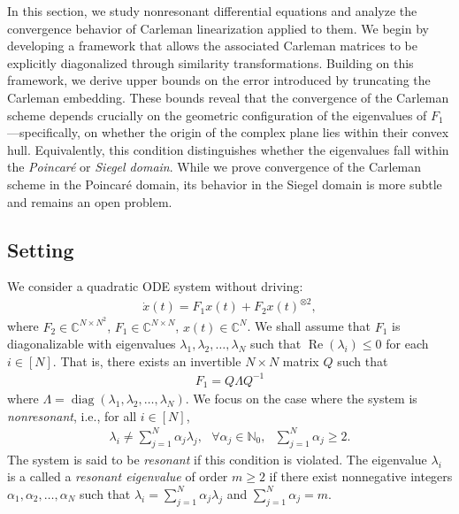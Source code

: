 \documentclass[superscriptaddress,onecolumn,nofootinbib,longbibliography,a4paper,accepted=2026-09-29]{quantumarticle}
\theoremstyle{plain}
\theoremstyle{definition}
\numberwithin{thm}{section}
\numberwithin{assumption}{section}
\numberwithin{lemma}{section}
\numberwithin{prop}{section}
\numberwithin{cor}{section}
\numberwithin{definition}{section}
\numberwithin{rmk}{section}
\numberwithin{equation}{section}
\newcommand{\myC}{\mathbb{C}}
\newcommand{\myN}{\mathbb{N}}
\newcommand{\lrb}[1]{\left ( #1 \right )}
\newcommand{\realpart}[1]{\operatorname{Re}\lrb{#1}}
\newcommand{\diag}[1]{\operatorname{diag}\lrb{#1}}
\begin{document}
In this section, we study nonresonant differential equations and analyze the convergence behavior of Carleman linearization applied to them. We begin by developing a framework that allows the associated Carleman matrices to be explicitly diagonalized through similarity transformations. Building on this framework, we derive upper bounds on the error introduced by truncating the Carleman embedding. These bounds reveal that the convergence of the Carleman scheme depends crucially on the geometric configuration of the eigenvalues of $F_1$—specifically, on whether the origin of the complex plane lies within their convex hull. Equivalently, this condition distinguishes whether the eigenvalues fall within the \emph{Poincar\'{e}} or \emph{Siegel domain}. While we prove convergence of the Carleman scheme in the Poincar\'{e} domain, its behavior in the Siegel domain is more subtle and remains an open problem.



\subsection{Setting}
\label{subsec:standard_form_nonresonant_system}


We consider a quadratic ODE system without driving:
\begin{align}
\dot{x}(t) = F_1 x(t) + F_2 x(t)^{\otimes 2},    
\label{eq:general_ode_system}
\end{align}
where $F_2 \in \myC^{N \times N^2}$, $F_1 \in \myC^{N \times N}$, $x(t) \in \myC^N$. We shall assume that $F_1$ is diagonalizable with eigenvalues $\lambda_1,\lambda_2, \dots, \lambda_N$ such that $\realpart{\lambda_i} \le 0$ for each $i \in [N]$. That is, there exists an invertible $N \times N$ matrix $Q$ such that
\begin{align}
F_1=Q\Lambda Q^{-1}
\end{align}
where $\Lambda = \diag{\lambda_1, \lambda_2,\dots, \lambda_N}$. We focus on the case where the system is \emph{nonresonant}, i.e., for all $i \in [N]$, 
\begin{align}
\lambda_i \neq \sum_{j=1}^N \alpha_j \lambda_j,~~~\forall \alpha_j \in \myN_0,~~~\sum_{j=1}^N \alpha_j \ge 2.    
\end{align}
The system is said to be \emph{resonant} if this condition is violated. The eigenvalue $\lambda_i$ is a called a \emph{resonant eigenvalue} of order $m \ge 2$ if there exist nonnegative integers $\alpha_1, \alpha_2, \dots, \alpha_N$ such that  $\lambda_i=\sum_{j=1}^N \alpha_j \lambda_j$ and $\sum_{j=1}^N \alpha_j=m$.
\end{document}
